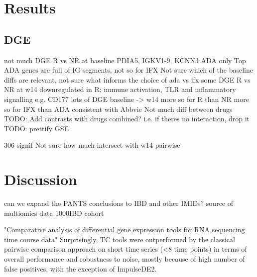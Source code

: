 \begin{outline}
\section{Results}

\subsection{DGE}

not much DGE R vs NR at baseline
PDIA5, IGKV1-9, KCNN3 ADA only
Top ADA genes are full of IG segments, not so for IFX
Not sure which of the baseline diffs are relevant, not sure what informs the choice of ada vs ifx
some DGE R vs NR at w14
downregulated in R: immune activation, TLR and inflammatory signalling
e.g. CD177
lots of DGE baseline -> w14
more so for R than NR
more so for IFX than ADA
consistent with Abbvie
Not much diff between drugs
TODO: Add contrasts with drugs combined?
i.e. if theres no interaction, drop it
TODO: prettify GSE

306 signif
Not sure how much intersect with w14 pairwise

\section{Discussion}


%

\1 can we expand the PANTS conclusions to IBD and other IMIDs?
\1 source of multiomics data 1000IBD cohort \autocite{imhann20191000IBDProjectMultiomics}

"Comparative analysis of differential gene expression tools for RNA sequencing time course data"
Surprisingly, TC tools were outperformed by the classical pairwise comparison approach on short time series (<8 time points) in terms of overall performance and robustness to noise, mostly because of high number of false positives, with the exception of ImpulseDE2.


\end{outline}
